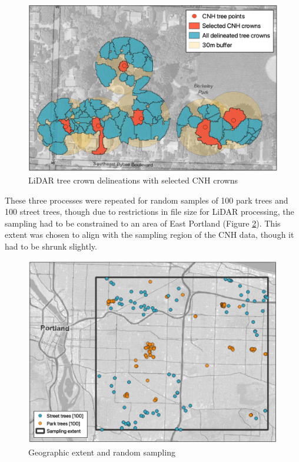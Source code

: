 \documentclass[12pt,twoside]{reedthesis}
\begin{document}
\begin{figure}

{\centering \includegraphics[width=0.8\linewidth]{figure/selected_lidar} 

}

\caption{LiDAR tree crown delineations with selected CNH crowns}\label{fig:unnamed-chunk-6}
\end{figure}
These three processes were repeated for random samples of 100 park trees and 100 street trees, though due to restrictions in file size for LiDAR processing, the sampling had to be constrained to an area of East Portland (Figure \ref{fig:clip-extent}). This extent was chosen to align with the sampling region of the CNH data, though it had to be shrunk slightly.
\begin{figure}

{\centering \includegraphics[width=0.8\linewidth]{figure/extent_and_samples} 

}

\caption{Geographic extent and random sampling}\label{fig:clip-extent}
\end{figure}
\end{document}
